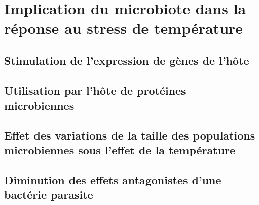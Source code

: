 \chapter{Implication du microbiote dans la réponse au stress de température} %
	\label{sec:implicationµbiote}
		

	\section{Stimulation de l'expression de gènes de l'hôte} %
		\label{sec:gènes_hôte}
			

	\section{Utilisation par l'hôte de protéines microbiennes} %
	 	\label{sec:gènes_microbiens}
	 		

	\section{Effet des variations de la taille des populations microbiennes sous l'effet de la température}
	 	\label{sec:pop_bact}
	 		

	\section{Diminution des effets antagonistes d'une bactérie parasite}
	 	\label{sec:diminution_antagonisme}
	 		

	



